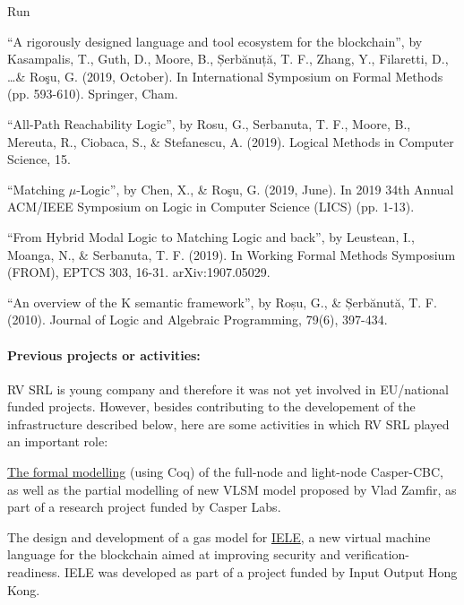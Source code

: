 \begin{sitedescription}{Run}
\begin{compactitem}
\item ``A rigorously designed language and tool ecosystem for the blockchain'', by Kasampalis, T., Guth, D., Moore, B., Șerbănuță, T. F., Zhang, Y., Filaretti, D., \ldots \& Roşu, G. (2019, October). In International Symposium on Formal Methods (pp. 593-610). Springer, Cham.
\item ``All-Path Reachability Logic'', by Rosu, G., Serbanuta, T. F., Moore, B., Mereuta, R., Ciobaca, S., \& Stefanescu, A. (2019). Logical Methods in Computer Science, 15.
\item ``Matching $\mu$-Logic'', by Chen, X., \& Roşu, G. (2019, June). In 2019 34th Annual ACM/IEEE Symposium on Logic in Computer Science (LICS) (pp. 1-13).
\item ``From Hybrid Modal Logic to Matching Logic and back'', by Leustean, I., Moanga, N., \& Serbanuta, T. F. (2019). In Working Formal Methods Symposium (FROM), EPTCS 303, 16-31. arXiv:1907.05029.
\item ``An overview of the K semantic framework'', by Roșu, G., \& Șerbănută, T. F. (2010).  Journal of Logic and Algebraic Programming, 79(6), 397-434.
\end{compactitem}

\paragraph*{Previous projects or activities:}


RV SRL is young company and therefore it was not yet involved in EU/national funded projects.
However, besides contributing to the developement of the infrastructure described below,
here are some activities in which RV SRL played an important role:
\begin{compactitem}
\item \href{https://github.com/runtimeverification/casper-cbc-proofs}{The formal modelling}
(using Coq) of the full-node and light-node Casper-CBC, as well as the partial
modelling of new VLSM model proposed by Vlad Zamfir, as part of a research
project funded by Casper Labs.
\item The design and development of a gas model for
\href{https://github.com/runtimeverification/iele-semantics}{IELE}, a new
virtual machine language for the blockchain aimed at improving security and
verification-readiness. IELE was developed as part of a project funded
by Input Output Hong Kong.
\end{compactitem}


\end{sitedescription}

